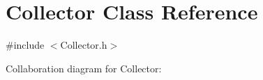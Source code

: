 \hypertarget{classCollector}{}\section{Collector Class Reference}
\label{classCollector}


{\ttfamily \#include $<$Collector.\+h$>$}



Collaboration diagram for Collector\+:
